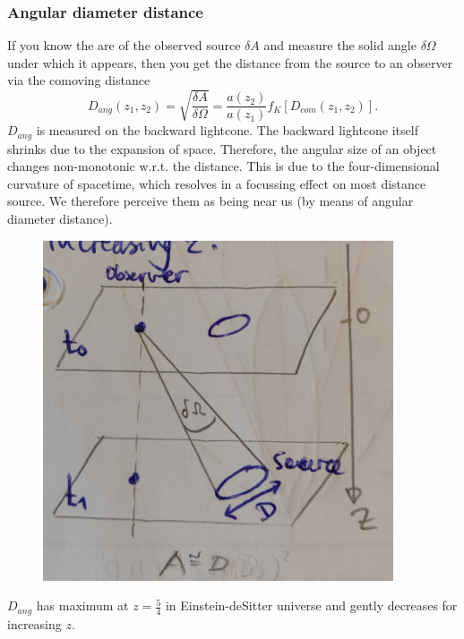 \subsubsection{Angular diameter distance}
If you know the are of the observed source $\delta A$ and measure the solid angle $\delta \Omega$ under which it appears, then you get the distance from the source to an observer via the comoving distance
\begin{equation}
	D_{ang}(z_1,z_2) = \sqrt{\frac{\delta A}{\delta \Omega}} = \frac{a(z_2)}{a(z_1)} f_K\left[D_{com}(z_1,z_2)\right].
\end{equation}
$D_{ang}$ is measured on the backward lightcone. The backward lightcone itself shrinks due to the expansion of space. Therefore, the angular size of an object changes non-monotonic w.r.t. the distance. This is due to the four-dimensional curvature of spacetime, which resolves in a focussing effect on most distance source. We therefore perceive them as being near us (by means of angular diameter distance).

\begin{figure}[h!]
	\centering
	\includegraphics[width=0.7\linewidth]{gfx/AngulardiameterDistance}
	\caption{}
	\label{fig:angulardiameterdistance}
\end{figure}





$D_{ang}$ has maximum at $z=\frac{5}{4}$ in Einstein-deSitter universe and gently decreases for increasing $z$.

